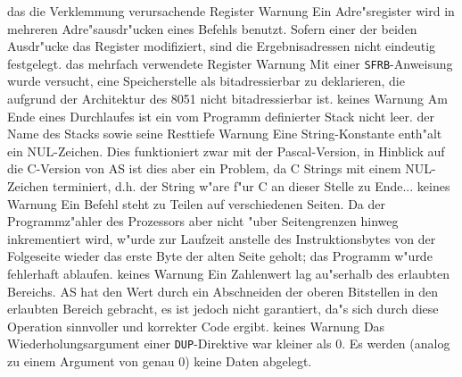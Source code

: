 \documentclass[12pt,a4paper,twoside]{report}
\newcommand{\tty}[1]{{\tt #1}}
\begin{document}
\begin{description}
               {das die Verklemmung verursachende Register}
               {Warnung}
               {Ein Adre"sregister wird in mehreren
                Adre"sausdr"ucken eines Befehls benutzt.  Sofern einer der
                beiden Ausdr"ucke das Register modifiziert, sind die
                Ergebnisadressen nicht eindeutig festgelegt.}
               {das mehrfach verwendete Register}
               {Warnung}
               {Mit einer \tty{SFRB}-Anweisung wurde
                versucht, eine Speicherstelle als bitadressierbar zu
                deklarieren, die aufgrund der Architektur des 8051 nicht
                bitadressierbar ist.}
               {keines}
               {Warnung}
               {Am Ende eines Durchlaufes ist ein vom
                Programm definierter Stack nicht leer.}
               {der Name des Stacks sowie seine Resttiefe}
	       {Warnung}
	       {Eine String-Konstante enth"alt ein
                NUL-Zeichen. Dies funktioniert zwar mit der Pascal-Version,
                in Hinblick auf die C-Version von AS ist dies aber ein Problem,
                da C Strings mit einem NUL-Zeichen terminiert, d.h. der String
                w"are f"ur C an dieser Stelle zu Ende...}
	       {keines}
	       {Warnung}
	       {Ein Befehl steht zu Teilen auf
                verschiedenen Seiten.  Da der Programmz"ahler des Prozessors
                aber nicht "uber Seitengrenzen hinweg inkrementiert wird,
                w"urde zur Laufzeit anstelle des Instruktionsbytes von der
                Folgeseite wieder das erste Byte der alten Seite geholt; das
                Programm w"urde fehlerhaft ablaufen.}
	       {keines}
               {Warnung}
               {Ein Zahlenwert lag au"serhalb des erlaubten Bereichs.  AS
                hat den Wert durch ein Abschneiden der oberen Bitstellen
                in den erlaubten Bereich gebracht, es ist jedoch nicht
                garantiert, da"s sich durch diese Operation sinnvoller und
                korrekter Code ergibt.}
               {keines}
               {Warnung}
               {Das Wiederholungsargument einer \tty{DUP}-Direktive war
                kleiner als 0.  Es werden (analog zu einem Argument von
                genau 0) keine Daten abgelegt.}

\end{description}
\end{document}
